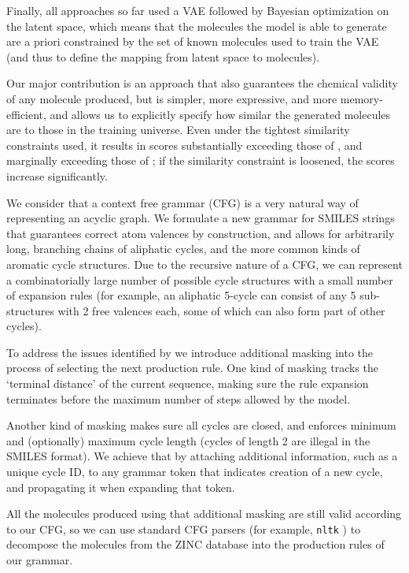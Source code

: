 \documentclass{article}
\begin{document}
Finally, all approaches so far used a VAE \cite{kingsmawelling14} followed by Bayesian optimization on the latent space, which means that the molecules the model is able to generate are a priori constrained by the set of known molecules used to train the VAE (and thus to define the mapping from latent space to molecules).
 
Our major contribution is an approach that also guarantees the chemical validity of any molecule produced, but is simpler, more expressive, and more memory-efficient, and allows us to explicitly specify how similar the generated molecules are to those in the training universe. Even under the tightest similarity constraints used, it results in scores substantially exceeding those of \cite{jin18}, and marginally exceeding those of \cite{kajino18}; if the similarity constraint is loosened, the scores increase significantly.
 
We consider that a context free grammar (CFG) is a very natural way of representing an acyclic graph. We formulate a new grammar for SMILES strings that guarantees correct atom valences by construction, and allows for arbitrarily long, branching chains of aliphatic cycles, and the more common kinds of aromatic cycle structures. Due to the recursive nature of a CFG, we can represent a combinatorially large number of possible cycle structures with a small number of expansion rules (for example, an aliphatic 5-cycle can consist of any 5 sub-structures with 2 free valences each, some of which can also form part of other cycles).
 
To address the issues identified by \cite{kusner17}  we introduce additional masking into the process of selecting the next production rule. One kind of masking tracks the `terminal distance' of the current sequence, making sure the rule expansion terminates before the maximum number of steps allowed by the model. 
 
Another kind of masking makes sure all cycles are closed, and enforces minimum and (optionally) maximum cycle length (cycles of length 2 are illegal in the SMILES format). We achieve that by attaching additional information, such as a unique cycle ID, to any grammar token that indicates creation of a new cycle, and propagating it when expanding that token.
 
All the molecules produced using that additional masking are still valid according to our CFG, so we can use standard CFG parsers (for example, \verb|nltk| \cite{BirdKleinLoper09NLTK}) to decompose the molecules from the ZINC database \cite{Weininger88} into the production rules of our grammar.
 
\end{document}
